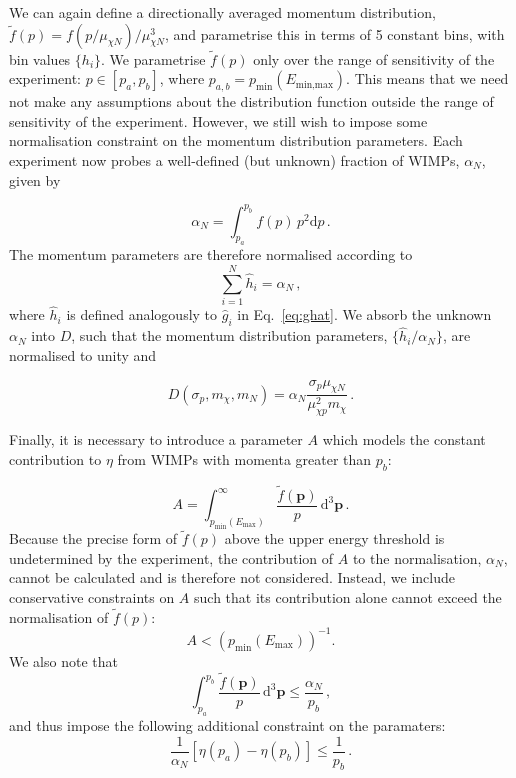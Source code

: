 We can again define a directionally averaged momentum distribution, \(\tilde{f}(p) = f(p/\mu_{\chi N})/\mu_{\chi N}^3\), and parametrise this in terms of 5 constant bins, with bin values \(\{h_i\}\). We parametrise \(\tilde{f}(p)\) only over the range of sensitivity of the experiment: \(p \in \left[p_a, p_b\right]\), where \(p_{a,b} = p_\textrm{min}(E_\textrm{min,max})\). This means that we need not make any assumptions about the distribution function outside the range of sensitivity of the experiment. However, we still wish to impose some normalisation constraint on the momentum distribution parameters. Each experiment now probes a well-defined (but unknown) fraction of WIMPs, \(\alpha_N\), given by

\begin{equation}
\alpha_N = \int_{p_a}^{p_b} f(p) \, p^2 \textrm{d}p\,.
\end{equation}
The momentum parameters are therefore normalised according to
\begin{equation}
\sum_{i = 1}^N \hat{h}_i = \alpha_N \,,
\end{equation}
where \(\hat{h}_i\) is defined analogously to \(\hat{g}_i\) in Eq.\ \ref{eq:ghat}. We absorb the unknown \(\alpha_N\) into \(D\), such that the momentum distribution parameters, \(\{\hat{h}_i/\alpha_N\}\), are normalised to unity and

\begin{equation}
\label{eq:D}
D(\sigma_p,m_\chi,m_N) = \alpha_N \frac{\sigma_p \mu_{\chi N}}{\mu_{\chi p}^2 m_\chi}\,.
\end{equation}

Finally, it is necessary to introduce a parameter \(A\) which models the constant contribution to \(\eta\) from WIMPs with momenta greater than \(p_b\):

\begin{equation}
A = \int_{p_\textrm{min}(E_\textrm{max})}^\infty \frac{\tilde{f}(\textbf{p})}{p}\, \textrm{d}^3\textbf{p}\,.
\end{equation}
Because the precise form of \(\tilde{f}(p)\) above the upper energy threshold is undetermined by the experiment, the contribution of \(A\) to the normalisation, \(\alpha_N\), cannot be calculated and is therefore not considered. Instead, we include conservative constraints on \(A\) such that its contribution alone cannot exceed the normalisation of \(\tilde{f}(p)\):
\begin{equation}
A < (p_\textrm{min}(E_\textrm{max}))^{-1}.
\end{equation}
We also note that
\begin{equation}
\int_{p_a}^{p_b} \frac{\tilde{f}(\textbf{p})}{p} \, \textrm{d}^3\textbf{p} \leq \frac{\alpha_N}{p_b} \,,
\end{equation}
and thus impose the following additional constraint on the paramaters:
\begin{equation}
\frac{1}{\alpha_N}\left[\eta(p_a) - \eta(p_b)\right] \leq \frac{1}{p_b}\,.
\end{equation}

